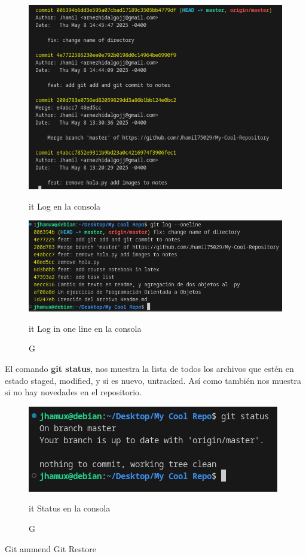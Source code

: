 \begin{figure}
	\centering
	\includegraphics[scale = 0.7]{Images/gitlog1}
	\caption Git Log en la consola
	
	\includegraphics[scale = 0.7]{Images/gitlog2}
	\caption Git Log in one line en la consola
\end{figure}

El comando \textbf{git status}, nos muestra la lista de todos los archivos que estén en estado staged, modified, y si es nuevo, untracked. Así como también nos muestra si no hay novedades en el repositorio.

\begin{figure}
	\centering
	\includegraphics[scale = 0.7]{Images/gitstatus}
	\caption Git Status en la consola
\end{figure}





Git ammend
Git Restore